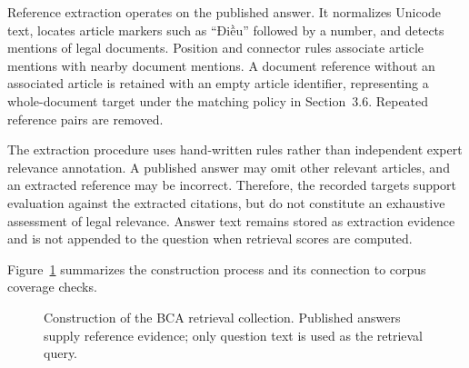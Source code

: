 Reference extraction operates on the published answer. It normalizes Unicode text, locates article markers such as ``Điều'' followed by a number, and detects mentions of legal documents. Position and connector rules associate article mentions with nearby document mentions. A document reference without an associated article is retained with an empty article identifier, representing a whole-document target under the matching policy in Section~3.6. Repeated reference pairs are removed.

The extraction procedure uses hand-written rules rather than independent expert relevance annotation. A published answer may omit other relevant articles, and an extracted reference may be incorrect. Therefore, the recorded targets support evaluation against the extracted citations, but do not constitute an exhaustive assessment of legal relevance. Answer text remains stored as extraction evidence and is not appended to the question when retrieval scores are computed.

Figure~\ref{fig:4.2} summarizes the construction process and its connection to corpus coverage checks.

\begin{figure}[p]
\centering
{}
\caption[Construction of the BCA retrieval collection.]{Construction of the BCA retrieval collection. Published answers supply reference evidence; only question text is used as the retrieval query.}
\label{fig:4.2}
\end{figure}

